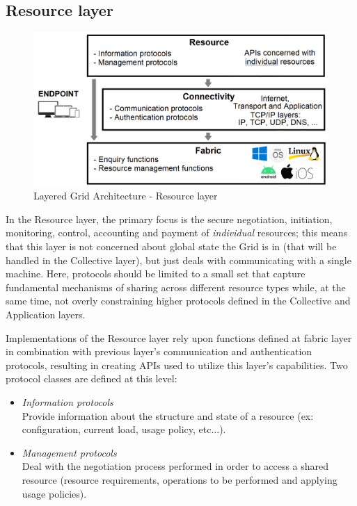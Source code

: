 \subsection{Resource layer}
\begin{figure}[!ht]
    \centering
    \includegraphics[scale=0.35]{document/chapters/chapter_2/images/resource_layer.png}
    \caption{Layered Grid Architecture - Resource layer}
    \label{fig:resource_layer}
\end{figure}

\noindent In the Resource layer, the primary focus is the secure negotiation, initiation, monitoring, control, accounting and payment of \textit{individual} resources; this means that this layer is not concerned about global state the Grid is in (that will be handled in the Collective layer), but just deals with communicating with a single machine. Here, protocols should be limited to a small set that capture fundamental mechanisms of sharing across different resource types while, at the same time, not overly constraining higher protocols defined in the Collective and Application layers.

Implementations of the Resource layer rely upon functions defined at fabric layer in combination with previous layer's communication and authentication protocols, resulting in creating APIs used to utilize this layer's capabilities.
Two protocol classes are defined at this level:
\begin{itemize}
    \item \textit{Information protocols}\\
    Provide information about the structure and state of a resource (ex: configuration, current load, usage policy, etc...).
    \item \textit{Management protocols}\\
    Deal with the negotiation process performed in order to access a shared resource (resource requirements, operations to be performed and applying usage policies).
\end{itemize} 

